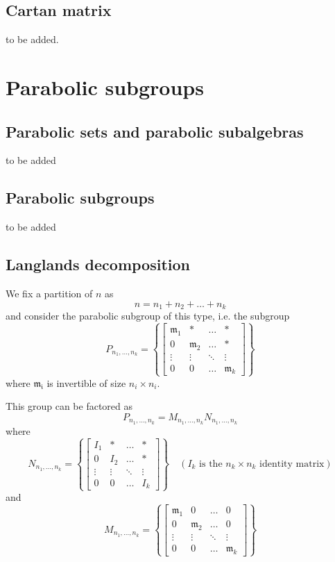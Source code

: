 \documentclass[12pt]{article} %
\begin{document}
\subsection{Cartan matrix}
to be added.
\section{Parabolic subgroups}
\subsection{Parabolic sets and parabolic subalgebras}
to be added
\subsection{Parabolic subgroups}
to be added
\subsection{Langlands decomposition}
We fix a partition of $n$ as
\[n=n_1+n_2+\ldots+n_k\]
and consider the parabolic subgroup of this type, i.e. the subgroup
\[P_{n_1,\ldots, n_k} = \left\lbrace \begin{bmatrix}
        \mathfrak{m}_1 & \ast           & \ldots & \ast           \\
        0              & \mathfrak{m}_2 & \ldots & \ast           \\
        \vdots         & \vdots         & \ddots & \vdots         \\
        0              & 0              & \ldots & \mathfrak{m}_k
    \end{bmatrix} \right\rbrace\]
where $\mathfrak{m_i}$ is invertible of size $n_i \times n_i$.

This group can be factored as
\[P_{n_1,\ldots, n_k} =M_{n_1,\ldots, n_k}N_{n_1,\ldots, n_k}\]
where
\[N_{n_1,\ldots, n_k} = \left\lbrace \begin{bmatrix}
        I_1    & \ast   & \ldots & \ast   \\
        0      & I_2    & \ldots & \ast   \\
        \vdots & \vdots & \ddots & \vdots \\
        0      & 0      & \ldots & I_k
    \end{bmatrix} \right\rbrace \quad \left(I_k \text{ is the $n_k\times n_k$ identity matrix}\right)\]
and
\[M_{n_1,\ldots, n_k} = \left\lbrace \begin{bmatrix}
        \mathfrak{m}_1 & 0              & \ldots & 0              \\
        0              & \mathfrak{m}_2 & \ldots & 0              \\
        \vdots         & \vdots         & \ddots & \vdots         \\
        0              & 0              & \ldots & \mathfrak{m}_k
    \end{bmatrix} \right\rbrace\]
\end{document}
